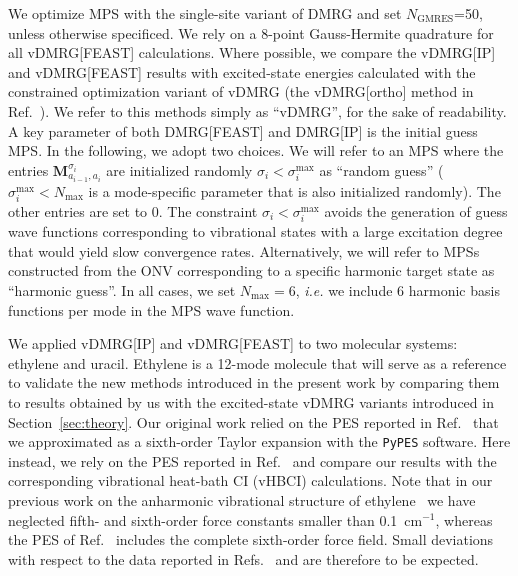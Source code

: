 \documentclass[journal=jctcce]{achemso}
\begin{document}
We optimize MPS with the single-site variant of DMRG and set $N_\text{GMRES}$=50, unless otherwise specificed.
We rely on a 8-point Gauss-Hermite quadrature for all vDMRG[FEAST] calculations.
Where possible, we compare the vDMRG[IP] and vDMRG[FEAST] results with excited-state energies calculated with the constrained optimization variant of vDMRG (the vDMRG[ortho] method in Ref.~).
We refer to this methods simply as ``vDMRG'', for the sake of readability. \\

\noindent A key parameter of both DMRG[FEAST] and DMRG[IP] is the initial guess MPS.
In the following, we adopt two choices.
We will refer to an MPS where the entries $\bm{M}_{a_{i-1},a_i}^{\sigma_i}$ are initialized randomly $\sigma_i < \sigma_i^\text{max}$ 
as ``random guess'' 
($\sigma_i^\text{max} < N_\text{max}$ is a mode-specific parameter that is also initialized randomly).
The other entries are set to 0. The constraint $\sigma_i < \sigma_i^\text{max}$  avoids the generation of guess wave functions corresponding to vibrational states with a large excitation degree that would yield slow convergence rates.
Alternatively, we will refer 
to MPSs constructed from the ONV corresponding to a specific harmonic target state
as ``harmonic guess''.
In all cases, we set $N_\text{max}=6$, \textit{i.e.} we include 6 harmonic basis functions per mode in the MPS wave function.

\noindent We applied vDMRG[IP] and vDMRG[FEAST] to two molecular systems: ethylene and uracil.
Ethylene is a 12-mode molecule that will serve as a reference to validate the new methods introduced in the present work by comparing them to results obtained by us\cite{Baiardi2017_VDMRG,Baiardi2019_HighEnergy-vDMRG} with the excited-state vDMRG variants introduced in Section~\ref{sec:theory}.
Our original work relied on the PES reported in Ref.~ that we approximated as a sixth-order Taylor expansion with the \texttt{PyPES} software.\cite{Crittenden2015_PyPES}
Here instead, we rely on the PES reported in Ref.~ and compare our results with the corresponding vibrational heat-bath CI (vHBCI) calculations.
Note that in our previous work on the anharmonic vibrational structure of ethylene~\cite{Baiardi2017_VDMRG} we have neglected fifth- and sixth-order force constants smaller than 0.1~cm$^{-1}$, whereas the PES of Ref.~ includes the complete sixth-order force field.
Small deviations with respect to the data reported in Refs.~ and  are therefore to be expected.
\end{document}
